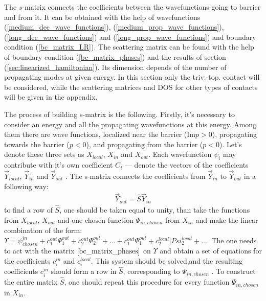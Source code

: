 The $ s $-matrix connects the coefficients between the wavefunctions going to barrier and from it. It can be obtained with the help of wavefunctions (\ref{medium_dec_wave_functions}), (\ref{medium_prop_wave_functions}),
(\ref{long_dec_wave_functions}) and
(\ref{long_prop_wave_functions})
and boundary condition (\ref{bc_matrix_LR}).
The scattering matrix can be found with the help of boundary condition (\ref{bc_matrix_phases}) and the results of section (\ref{sec:linearized_hamiltonian}). Its dimension depends of the number of propagating modes at given energy. In this section only the triv.-top. contact will be considered, while the scattering matrices and DOS for other types of contacts will be given in the appendix.

The process of building s-matrix is the following. Firstly, it's necessary to consider an energy and all the propagating  wavefunctions at this energy. Among them there are wave functions, localized near the barrier ($ \mathrm{Im}p>0 $), propagating towards the barrier ($  p<0 $), and propagating from the barrier ($ p<0 $). Let's denote these  three sets as $ X_{local} $, $ X_{in}  $ and $ X_{out} $. Each wavefunction $ \psi_i $ may contribute with it's own coefficient $ C_i $ --- denote the vectors of the coefficients  $ \vec{Y}_{local} $, $ \vec{Y}_{in}  $ and $ \vec{Y}_{out} $ . The s-matrix connects the coefficients from $ \vec{Y}_{in}  $ to $ \vec{Y}_{out} $ in a following way:
\begin{gather}
	\vec{Y}_{out} = \hat{S}\vec{Y}_{in}
\end{gather}
to find a row of $ \hat{S} $, one should be taken equal to unity, than take  the functions from $ X_{local} $, $ X_{out} $ and one chosen function $ \Psi_{in,chosen} $ from $ X_{in} $ and make the linear combination of the form: $\Upsilon =\psi^{in}_{chosen} + c^{out}_1\Psi^{out}_1+c^{out}_2\Psi^{out}_2+...+c^{out}_1\Psi^{out}_1+c^{local}_2]Psi^{local}_2+... $. The one needs to act with the matrix $ \ref{bc_matrix_phases} $ on $ \Upsilon $ and obtain a set of equations for the coefficients $ {c^{in}_i} $ and $ {c^{local}_i} $. This system should be solved,and the resulting coefficients ${c^{in}_i}  $ should form a row in $ \hat{S} $, corresponding to $ \Psi_{in,chosen} $ . To construct the entire matrix $ \hat{S} $, one should repeat this procedure for every function $ \Psi_{in,chosen} $ in $ X_{in} $.

